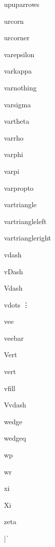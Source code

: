 \documentclass{article}
\begin{document}
upuparrows    \upuparrows{}

urcorn    \urcorn{}

urcorner    \urcorner{}


varepsilon    \varepsilon{}

varkappa    \varkappa{}

varnothing    \varnothing{}

varsigma    \varsigma{}

vartheta    \vartheta{}

varrho    \varrho{}

varphi    \varphi{}

varpi    \varpi{}

varpropto    \varpropto{}

vartriangle    \vartriangle{}

vartriangleleft    \vartriangleleft{}

vartriangleright    \vartriangleright{}

vdash    \vdash{}

vDash    \vDash{}

Vdash    \Vdash{}

vdots    \vdots{}

vee    \vee{}

veebar    \veebar{}

Vert    \Vert{}

vert    \vert{}

vfill    \vfill{}

Vvdash    \Vvdash{}


wedge    \wedge{}

wedgeq    \wedgeq{}

wp    \wp{}

wr    \wr{}

xi    \xi{}

Xi    \Xi{}

zeta    \zeta{}

|    \|{}
\end{document}
